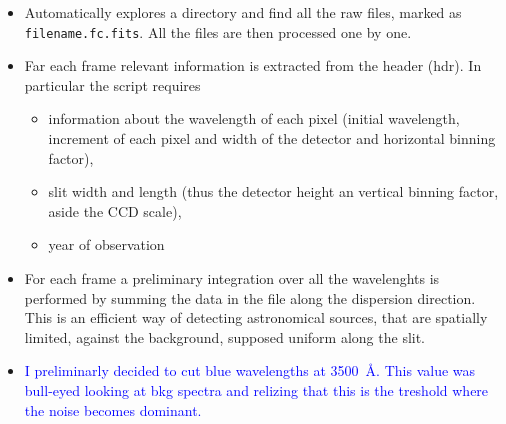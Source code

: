 \documentclass{article}
\newcommand{\arbitrario}[1]{\textcolor{blue}{#1}}
\begin{document}
\begin{itemize}
	\item Automatically explores a directory and find all the raw files, marked as \texttt{filename.fc.fits}. All the files are then processed one by one.
	
	\item Far each frame relevant information is extracted from the header (hdr). In particular the script requires
	\begin{itemize}
		\item information about the wavelength of each pixel (initial wavelength, increment of each pixel and width of the detector and horizontal binning factor),
		\item slit width and length (thus the detector height an vertical binning factor, aside the CCD scale),
		\item year of observation
	\end{itemize}
	\item For each frame a preliminary integration over all the wavelenghts is performed by summing the data in the file along the dispersion direction. This is an efficient way of detecting astronomical sources, that are spatially limited, against the background, supposed uniform along the slit.
	
	\item \arbitrario{I preliminarly decided to cut blue wavelengths at \SI{3500}{\angstrom}. This value was bull-eyed looking at bkg spectra and relizing that this is the treshold where the noise becomes dominant.}
	

\end{itemize}
\end{document}
